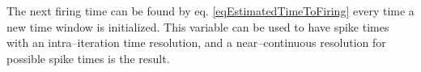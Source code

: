 		The next firing time can be found by eq. \ref{eqEstimatedTimeToFiring} every time a new time window is initialized.
		This variable can be used to have spike times with an intra--iteration time resolution, and a near--continuous resolution for possible spike times is the result.




% 		
% 		
% 		
	


